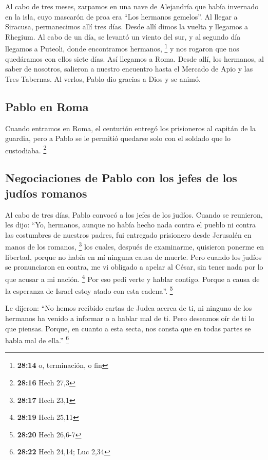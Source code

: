 \begin{paracol}{2}
 Al cabo de tres meses, zarpamos en una nave de
Alejandría que había invernado en la isla, cuyo mascarón de proa era
``Los hermanos gemelos''.  Al llegar a Siracusa,
permanecimos allí tres días.  Desde allí dimos la vuelta
y llegamos a Rhegium. Al cabo de un día, se levantó un viento del sur, y
al segundo día llegamos a Puteoli,  donde encontramos
hermanos, \footnote{\textbf{28:14} o, terminación, o fin} y nos rogaron
que nos quedáramos con ellos siete días. Así llegamos a Roma.
 Desde allí, los hermanos, al saber de nosotros, salieron
a nuestro encuentro hasta el Mercado de Apio y las Tres Tabernas. Al
verlos, Pablo dio gracias a Dios y se animó.

\hypertarget{pablo-en-roma}{%
\subsection{Pablo en Roma}\label{pablo-en-roma}}

 Cuando entramos en Roma, el centurión entregó los
prisioneros al capitán de la guardia, pero a Pablo se le permitió
quedarse solo con el soldado que lo custodiaba. \footnote{\textbf{28:16}
  Hech 27,3}

\hypertarget{negociaciones-de-pablo-con-los-jefes-de-los-juduxedos-romanos}{%
\subsection{Negociaciones de Pablo con los jefes de los judíos
romanos}\label{negociaciones-de-pablo-con-los-jefes-de-los-juduxedos-romanos}}

 Al cabo de tres días, Pablo convocó a los jefes de los
judíos. Cuando se reunieron, les dijo: ``Yo, hermanos, aunque no había
hecho nada contra el pueblo ni contra las costumbres de nuestros padres,
fui entregado prisionero desde Jerusalén en manos de los romanos,
\footnote{\textbf{28:17} Hech 23,1}  los cuales, después
de examinarme, quisieron ponerme en libertad, porque no había en mí
ninguna causa de muerte.  Pero cuando los judíos se
pronunciaron en contra, me vi obligado a apelar al César, sin tener nada
por lo que acusar a mi nación. \footnote{\textbf{28:19} Hech 25,11}
 Por eso pedí verte y hablar contigo. Porque a causa de
la esperanza de Israel estoy atado con esta cadena''. \footnote{\textbf{28:20}
  Hech 26,6-7}

 Le dijeron: ``No hemos recibido cartas de Judea acerca
de ti, ni ninguno de los hermanos ha venido a informar o a hablar mal de
ti.  Pero deseamos oír de ti lo que piensas. Porque, en
cuanto a esta secta, nos consta que en todas partes se habla mal de
ella.'' \footnote{\textbf{28:22} Hech 24,14; Luc 2,34}


\end{paracol}
